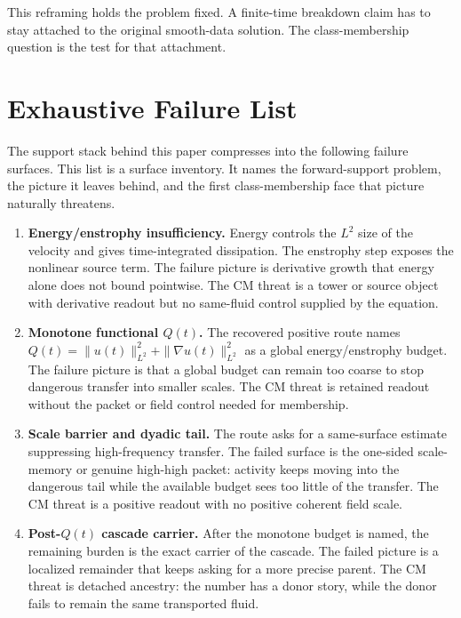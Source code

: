 \documentclass[11pt]{article}
\begin{document}
This reframing holds the problem fixed.
A finite-time breakdown claim has to stay attached to the original smooth-data solution.
The class-membership question is the test for that attachment.

\section{Exhaustive Failure List}

The support stack behind this paper compresses into the following failure surfaces.
This list is a surface inventory.
It names the forward-support problem, the picture it leaves behind, and the first class-membership face that picture naturally threatens.

\begin{enumerate}[leftmargin=2em]
\item \textbf{Energy/enstrophy insufficiency.}
Energy controls the \(L^2\) size of the velocity and gives time-integrated dissipation.
The enstrophy step exposes the nonlinear source term.
The failure picture is derivative growth that energy alone does not bound pointwise.
The CM threat is a tower or source object with derivative readout but no same-fluid control supplied by the equation.

\item \textbf{Monotone functional \(Q(t)\).}
The recovered positive route names \(Q(t)=\|u(t)\|_{L^2}^2+\|\nabla u(t)\|_{L^2}^2\) as a global energy/enstrophy budget.
The failure picture is that a global budget can remain too coarse to stop dangerous transfer into smaller scales.
The CM threat is retained readout without the packet or field control needed for membership.

\item \textbf{Scale barrier and dyadic tail.}
The route asks for a same-surface estimate suppressing high-frequency transfer.
The failed surface is the one-sided scale-memory or genuine high-high packet: activity keeps moving into the dangerous tail while the available budget sees too little of the transfer.
The CM threat is a positive readout with no positive coherent field scale.

\item \textbf{Post-\(Q(t)\) cascade carrier.}
After the monotone budget is named, the remaining burden is the exact carrier of the cascade.
The failed picture is a localized remainder that keeps asking for a more precise parent.
The CM threat is detached ancestry: the number has a donor story, while the donor fails to remain the same transported fluid.


\end{enumerate}
\end{document}
